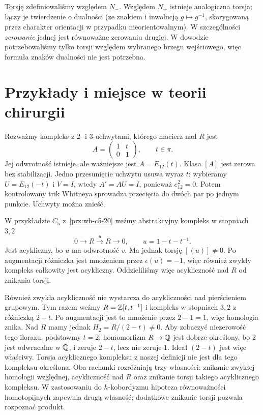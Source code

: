 \begin{samepage}
\begin{uwaga}
Torsję zdefiniowaliśmy względem $N_-$.
Względem $N_+$ istnieje analogiczna torsja;
łączy je twierdzenie o dualności (ze znakiem
i inwolucją $g\mapsto g^{-1}$, skorygowaną
przez charakter orientacji w przypadku
nieorientowalnym). W szczególności
\emph{zerowanie} jednej jest równoważne
zerowaniu drugiej. W dowodzie potrzebowaliśmy
tylko torsji względem wybranego brzegu wejściowego,
więc formuła znaków dualności nie jest potrzebna.
\end{uwaga}
\end{samepage}

\section{Przykłady i miejsce w teorii chirurgii}
\label{sec:przyklady-s-kobordyzm-20}

\begin{przyklad}
Rozważmy kompleks z $2$- i $3$-uchwytami,
którego macierz nad $R$ jest
\[
 A=\begin{pmatrix}1&t\\0&1\end{pmatrix},\qquad t\in\pi.
\]
Jej odwrotność istnieje, ale ważniejsze jest
$A=E_{12}(t)$. Klasa $[A]$ jest zerowa bez
stabilizacji. Jedno przesunięcie uchwytu
usuwa wyraz $t$: wybieramy $U=E_{12}(-t)$ i $V=I$,
wtedy $A'=AU=I$, ponieważ $e_{12}^2=0$.
Potem kontrolowany trik
Whitneya sprowadza przecięcia do dwóch
par po jednym punkcie. Uchwyty można znieść.
\end{przyklad}

\begin{przyklad}
W przykładzie $C_5$ z~\ref{prz:wh-c5-20}
weźmy abstrakcyjny kompleks w stopniach $3,2$
\[
 0\longrightarrow R\xrightarrow{\ u\ }R
   \longrightarrow0,\qquad u=1-t-t^{-1}.
\]
Jest acykliczny, bo $u$ ma odwrotność $v$.
Ma jednak torsję $[(u)]\ne0$.
Po augmentacji różniczka jest mnożeniem
przez $\epsilon(u)=-1$, więc również zwykły
kompleks całkowity jest acykliczny. Oddzieliliśmy więc
acykliczność nad $R$ od znikania torsji.

Również zwykła acykliczność nie wystarcza do acykliczności
nad pierścieniem grupowym. Tym razem weźmy
$R=\mathbb{Z}[t,t^{-1}]$ i kompleks w stopniach $3,2$
z różniczką $2-t$. Po augmentacji jest to mnożenie
przez $2-1=1$, więc homologia znika.
Nad $R$ mamy jednak $H_2=R/(2-t)\ne0$.
Aby zobaczyć niezerowość tego ilorazu, podstawmy $t=2$:
homomorfizm $R\to\mathbb{Q}$ jest dobrze określony,
bo $2$ jest odwracalne w $\mathbb{Q}$, i zeruje $2-t$,
lecz nie zeruje $1$. Ideał $(2-t)$ jest więc właściwy.
Torsja acyklicznego kompleksu z naszej definicji
nie jest dla tego kompleksu określona.
Oba rachunki rozróżniają trzy własności: znikanie zwykłej
homologii względnej, acykliczność nad $R$ oraz znikanie torsji
takiego acyklicznego kompleksu. W zastosowaniu do $h$-kobordyzmu
hipoteza równoważności homotopijnych zapewnia drugą własność;
dodatkowe znikanie torsji pozwala rozpoznać produkt.
\end{przyklad}

